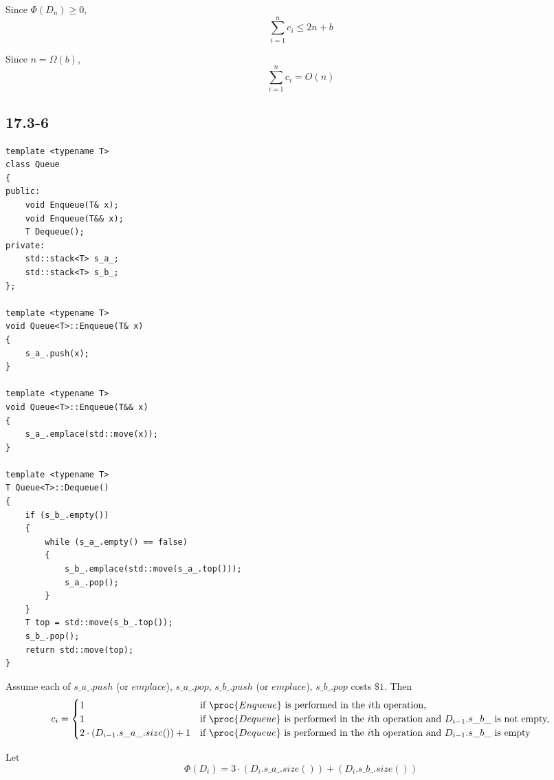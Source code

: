Since $\Phi(D_{n}) \geq 0$,
\begin{equation*}
    \sum\limits_{i = 1}^n c_i \leq 2n + b
\end{equation*}

Since $n = \Omega(b)$,
\begin{equation*}
    \sum\limits_{i = 1}^n c_i = O(n)
\end{equation*}

\subsection*{17.3-6}

\begin{verbatim}
template <typename T>
class Queue
{
public:
    void Enqueue(T& x);
    void Enqueue(T&& x);
    T Dequeue();
private:
    std::stack<T> s_a_;
    std::stack<T> s_b_;
};

template <typename T>
void Queue<T>::Enqueue(T& x)
{
    s_a_.push(x);
}

template <typename T>
void Queue<T>::Enqueue(T&& x)
{
    s_a_.emplace(std::move(x));
}

template <typename T>
T Queue<T>::Dequeue()
{
    if (s_b_.empty())
    {
        while (s_a_.empty() == false)
        {
            s_b_.emplace(std::move(s_a_.top()));
            s_a_.pop();
        }
    }
    T top = std::move(s_b_.top());
    s_b_.pop();
    return std::move(top);
}
\end{verbatim}

Assume each of $s\_a\_.push$ (or $emplace$), $s\_a\_.pop$, 
$s\_b\_.push$ (or $emplace$), $s\_b\_.pop$ costs $\$1$.
Then
\begin{equation*}
    c_i = 
    \begin{cases}
        1 & \text{if $\proc{Enqueue}$ is performed in the $i$th operation,} \\
        1 & \text{if $\proc{Dequeue}$ is performed in the $i$th operation
            and $D_{i-1}.s\_b\_$ is not empty,} \\
        2 \cdot (D_{i-1}.s\_a\_.size()) + 1 
            & \text{if $\proc{Dequeue}$ is performed in the $i$th operation
            and $D_{i-1}.s\_b\_$ is empty} \\
    \end{cases}
\end{equation*}

Let 
\begin{equation*}
    \Phi(D_i) = 3 \cdot (D_i.s\_a\_.size()) + (D_i.s\_b\_.size())
\end{equation*}

